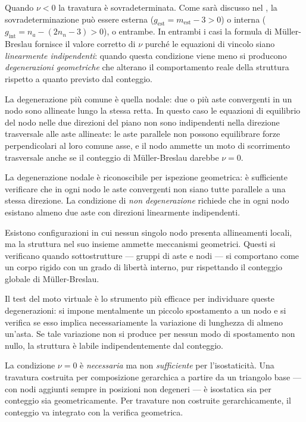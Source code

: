 Quando $\nu < 0$ la travatura è sovradeterminata.
Come sarà discusso nel ,
la sovradeterminazione può essere esterna
($g_\text{est} = m_\text{est} - 3 > 0$) o interna
($g_\text{int} = n_a - (2n_n - 3) > 0$), o entrambe.
In entrambi i casi la formula di M\"{u}ller-Breslau
fornisce il valore corretto di $\nu$ purché le
equazioni di vincolo siano \emph{linearmente
	indipendenti}: quando questa condizione viene meno
si producono \emph{degenerazioni geometriche} che
alterano il comportamento reale della struttura
rispetto a quanto previsto dal conteggio.

La degenerazione più comune è quella nodale: due
o più aste convergenti in un nodo sono allineate
lungo la stessa retta. In questo caso le equazioni
di equilibrio del nodo nelle due direzioni del piano
non sono indipendenti nella direzione trasversale
alle aste allineate: le aste parallele non possono
equilibrare forze perpendicolari al loro comune
asse, e il nodo ammette un moto di scorrimento
trasversale anche se il conteggio di M\"{u}ller-Breslau
darebbe $\nu = 0$.

La degenerazione nodale è riconoscibile per ispezione
geometrica: è sufficiente verificare che in ogni
nodo le aste convergenti non siano tutte parallele
a una stessa direzione. La condizione di
\emph{non degenerazione} richiede che in ogni nodo
esistano almeno due aste con direzioni linearmente
indipendenti.

Esistono configurazioni in cui nessun singolo nodo
presenta allineamenti locali, ma la struttura nel
suo insieme ammette meccanismi geometrici. Questi
si verificano quando sottostrutture --- gruppi di
aste e nodi --- si comportano come un corpo rigido
con un grado di libertà interno, pur rispettando
il conteggio globale di M\"{u}ller-Breslau.

Il test del moto virtuale è lo strumento più
efficace per individuare queste degenerazioni:
si impone mentalmente un piccolo spostamento a
un nodo e si verifica se esso implica
necessariamente la variazione di lunghezza di
almeno un'asta. Se tale variazione non si produce
per nessun modo di spostamento non nullo,
la struttura è labile indipendentemente dal
conteggio.

\begin{oss}
	La condizione $\nu = 0$ è \emph{necessaria}
	ma non \emph{sufficiente} per l'isostaticità.
	Una travatura costruita per composizione
	gerarchica a partire da un triangolo base ---
	con nodi aggiunti sempre in posizioni non
	degeneri --- è isostatica sia per conteggio
	sia geometricamente. Per travature non costruite
	gerarchicamente, il conteggio va integrato con
	la verifica geometrica.
\end{oss}


